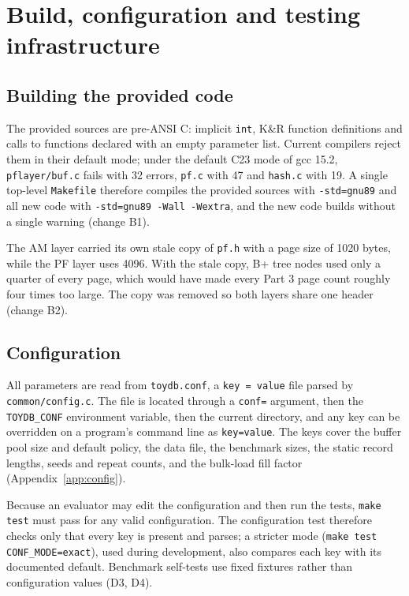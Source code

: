 \documentclass[11pt,a4paper]{article}
\begin{document}
\section{Build, configuration and testing infrastructure}
\label{sec:infra}

\subsection{Building the provided code}

The provided sources are pre-ANSI C: implicit \texttt{int}, K\&R function definitions and calls to functions declared with an empty parameter list. Current compilers reject them in their default mode; under the default C23 mode of gcc 15.2, \texttt{pflayer/buf.c} fails with 32 errors, \texttt{pf.c} with 47 and \texttt{hash.c} with 19. A single top-level \texttt{Makefile} therefore compiles the provided sources with \texttt{-std=gnu89} and all new code with \texttt{-std=gnu89 -Wall -Wextra}, and the new code builds without a single warning (change B1).

The AM layer carried its own stale copy of \texttt{pf.h} with a page size of 1020 bytes, while the PF layer uses 4096. With the stale copy, B+ tree nodes used only a quarter of every page, which would have made every Part 3 page count roughly four times too large. The copy was removed so both layers share one header (change B2).

\subsection{Configuration}

All parameters are read from \texttt{toydb.conf}, a \texttt{key = value} file parsed by \texttt{common/config.c}. The file is located through a \texttt{conf=} argument, then the \texttt{TOYDB\_CONF} environment variable, then the current directory, and any key can be overridden on a program's command line as \texttt{key=value}. The keys cover the buffer pool size and default policy, the data file, the benchmark sizes, the static record lengths, seeds and repeat counts, and the bulk-load fill factor (Appendix~\ref{app:config}).

Because an evaluator may edit the configuration and then run the tests, \texttt{make test} must pass for any valid configuration. The configuration test therefore checks only that every key is present and parses; a stricter mode (\texttt{make test CONF\_MODE=exact}), used during development, also compares each key with its documented default. Benchmark self-tests use fixed fixtures rather than configuration values (D3, D4).
\end{document}
